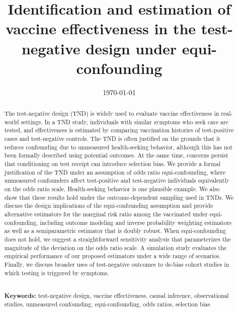 \documentclass[11pt]{article}
\begin{document}
\begin{titlepage}
\title{Identification and estimation of vaccine effectiveness in the test-negative design under equi-confounding}
\author{}


\date{\today\vspace{-1em}}
\maketitle

\begin{abstract}
The test-negative design (TND) is widely used to evaluate vaccine effectiveness in real-world settings. In a TND study, individuals with similar symptoms who seek care are tested, and effectiveness is estimated by comparing vaccination histories of test-positive cases and test-negative controls. The TND is often justified on the grounds that it reduces confounding due to unmeasured health-seeking behavior, although this has not been formally described using potential outcomes. At the same time, concerns persist that conditioning on test receipt can introduce selection bias. We provide a formal justification of the TND under an assumption of odds ratio equi-confounding, where unmeasured confounders affect test-positive and test-negative individuals equivalently on the odds ratio scale. Health-seeking behavior is one plausible example. We also show that these results hold under the outcome-dependent sampling used in TNDs. We discuss the design implications of the equi-confounding assumption and provide alternative estimators for the marginal risk ratio among the vaccinated under equi-confounding, including outcome modeling and inverse probability weighting estimators as well as a semiparametric estimator that is doubly robust.  When equi-confounding does not hold, we suggest a straightforward sensitivity analysis that parameterizes the magnitude of the deviation on the odds ratio scale. A simulation study evaluates the empirical performance of our proposed estimators under a wide range of scenarios. Finally, we discuss broader uses of test-negative outcomes to de-bias cohort studies in which testing is triggered by symptoms.

\noindent \\
\noindent\textbf{Keywords:} test-negative design, vaccine effectiveness, causal inference, observational studies, unmeasured confounding, equi-confounding, odds ratios, selection bias
\bigskip
\end{abstract}
\setcounter{page}{0}
\thispagestyle{empty}
\end{titlepage}
\end{document}
